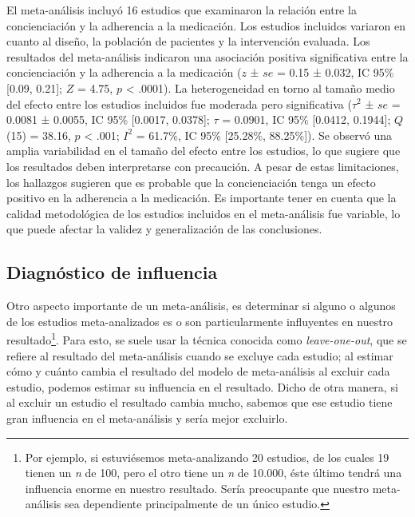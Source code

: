 \documentclass[
  bookmarksnumbered]{article}
\begin{document}
\begin{tcolorbox}[enhanced,attach boxed title to top center={yshift=-3mm,yshifttext=-1mm},
  colback=iacol!5!white,colframe=iacol!75!white,colbacktitle=iacol,
  title=Ejemplo de reporte con intervalos de confianza para heterogeneidad,fonttitle=\bfseries,
  boxed title style={size=small,colframe=iacol} ]
  
El meta-análisis incluyó 16 estudios que examinaron la relación entre la concienciación y la adherencia a la medicación. Los estudios incluidos variaron en cuanto al diseño, la población de pacientes y la intervención evaluada. Los resultados del meta-análisis indicaron una asociación positiva significativa entre la concienciación y la adherencia a la medicación ($z$ ± $se$ = 0.15 ± 0.032, IC 95\% [0.09, 0.21]; $Z$ = 4.75, $p$ < .0001). La heterogeneidad en torno al tamaño medio del efecto entre los estudios incluidos fue moderada pero significativa ($\tau^2$ ± $se$ =  0.0081 ± 0.0055, IC 95\% [0.0017, 0.0378]; $\tau$ = 0.0901, IC 95\% [0.0412, 0.1944]; $Q$(15) =  38.16, $p$ < .001; $I^2$ = 61.7\%, IC 95\% [25.28\%, 88.25\%]). Se observó una amplia variabilidad en el tamaño del efecto entre los estudios, lo que sugiere que los resultados deben interpretarse con precaución. A pesar de estas limitaciones, los hallazgos sugieren que es probable que la concienciación tenga un efecto positivo en la adherencia a la medicación. Es importante tener en cuenta que la calidad metodológica de los estudios incluidos en el meta-análisis fue variable, lo que puede afectar la validez y generalización de las conclusiones.

\end{tcolorbox}

\hypertarget{diag-inf}{%
\subsection{Diagnóstico de influencia}\label{diag-inf}}

Otro aspecto importante de un meta-análisis, es determinar si alguno o algunos de los estudios meta-analizados es o son particularmente influyentes en nuestro resultado\footnote{Por ejemplo, si estuviésemos meta-analizando 20 estudios, de los cuales 19 tienen un \emph{n} de 100, pero el otro tiene un \emph{n} de 10.000, éste último tendrá una influencia enorme en nuestro resultado. Sería preocupante que nuestro meta-análisis sea dependiente principalmente de un único estudio.}. Para esto, se suele usar la técnica conocida como \emph{leave-one-out}, que se refiere al resultado del meta-análisis cuando se excluye cada estudio; al estimar cómo y cuánto cambia el resultado del modelo de meta-análisis al excluir cada estudio, podemos estimar su influencia en el resultado. Dicho de otra manera, si al excluir un estudio el resultado cambia mucho, sabemos que ese estudio tiene gran influencia en el meta-análisis y sería mejor excluirlo.
\end{document}
